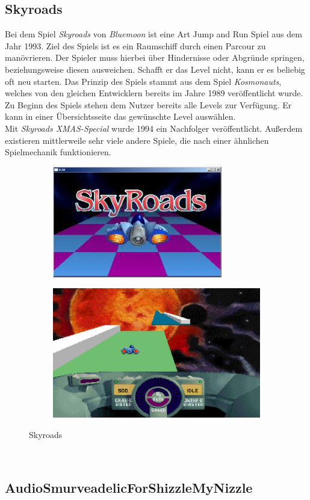 \subsection{Skyroads}
Bei dem Spiel \textit{Skyroads} von \textit{Bluemoon} ist eine Art Jump and Run Spiel aus dem Jahr 1993. Ziel des Spiels ist es ein Raumschiff durch einen Parcour zu manövrieren. Der Spieler muss hierbei über Hindernisse oder Abgründe springen, beziehungsweise diesen ausweichen. Schafft er das Level nicht, kann er es beliebig oft neu starten. Das Prinzip des Spiels stammt aus dem Spiel \textit{Kosmonauts}, welches von den gleichen Entwicklern bereits im Jahre 1989 veröffentlicht wurde. Zu Beginn des Spiels stehen dem Nutzer bereits alle Levels zur Verfügung. Er kann in einer Übersichtsseite das gewünschte Level auswählen. \\
Mit \textit{Skyroads XMAS-Special} wurde 1994 ein Nachfolger veröffentlicht. Außerdem existieren mittlerweile sehr viele andere Spiele, die nach einer ähnlichen Spielmechanik funktionieren.
\begin{figure}[ht]
	\centering
	\begin{subfigure}{6 cm}
	\centering
			\includegraphics{gfx/recherche/skyroads1.jpg}
	\end{subfigure}
	\begin{subfigure}{6 cm}
	\centering
			\includegraphics{gfx/recherche/skyroads2.jpg}  
	\end{subfigure}
	\caption{Skyroads}
\end{figure}\\

\subsection{AudioSmurveadelicForShizzleMyNizzle}
